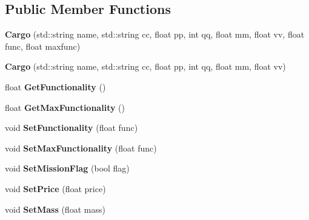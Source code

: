 \subsection*{Public Member Functions}
\begin{DoxyCompactItemize}
\item 
{\bfseries Cargo} (std\+::string name, std\+::string cc, float pp, int qq, float mm, float vv, float func, float maxfunc)\hypertarget{classCargo_acbf4db6b76a04a6be0dbb61858928315}{}\label{classCargo_acbf4db6b76a04a6be0dbb61858928315}

\item 
{\bfseries Cargo} (std\+::string name, std\+::string cc, float pp, int qq, float mm, float vv)\hypertarget{classCargo_acd839c4d5860d77c3c23555b4496e6e0}{}\label{classCargo_acd839c4d5860d77c3c23555b4496e6e0}

\item 
float {\bfseries Get\+Functionality} ()\hypertarget{classCargo_af9020c638ef7ef741fe51eb96402f59c}{}\label{classCargo_af9020c638ef7ef741fe51eb96402f59c}

\item 
float {\bfseries Get\+Max\+Functionality} ()\hypertarget{classCargo_acdda4de138bd233fa5f51480d23b39b6}{}\label{classCargo_acdda4de138bd233fa5f51480d23b39b6}

\item 
void {\bfseries Set\+Functionality} (float func)\hypertarget{classCargo_a8adc4994abf8ac4e34e542a1065444ba}{}\label{classCargo_a8adc4994abf8ac4e34e542a1065444ba}

\item 
void {\bfseries Set\+Max\+Functionality} (float func)\hypertarget{classCargo_a797ce6ee9e5bf5a8f02c5c1f9b5cf23d}{}\label{classCargo_a797ce6ee9e5bf5a8f02c5c1f9b5cf23d}

\item 
void {\bfseries Set\+Mission\+Flag} (bool flag)\hypertarget{classCargo_acb8724c763d3194e05a34d6322a04292}{}\label{classCargo_acb8724c763d3194e05a34d6322a04292}

\item 
void {\bfseries Set\+Price} (float price)\hypertarget{classCargo_a41821d363301db03c50255939c4347e4}{}\label{classCargo_a41821d363301db03c50255939c4347e4}

\item 
void {\bfseries Set\+Mass} (float mass)\hypertarget{classCargo_afb9e9cb6a66dfc2af8d7778964d32258}{}\label{classCargo_afb9e9cb6a66dfc2af8d7778964d32258}


\end{DoxyCompactItemize}
